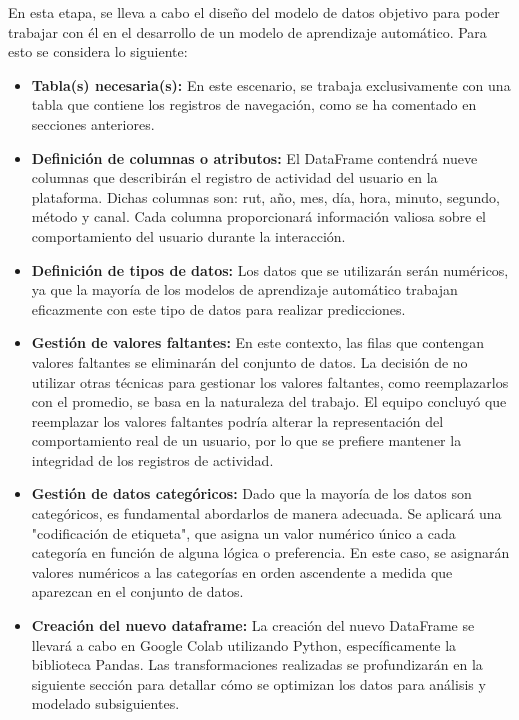 En esta etapa, se lleva a cabo el diseño del modelo de datos objetivo para poder trabajar con él en el desarrollo de un modelo de aprendizaje automático. Para esto se considera lo siguiente:
\begin{itemize}
    \item  \textbf{Tabla(s) necesaria(s):} En este escenario, se trabaja exclusivamente con una tabla que contiene los registros de navegación, como se ha comentado en secciones anteriores.
    \item \textbf{Definición de columnas o atributos:} El DataFrame contendrá nueve columnas que describirán el registro de actividad del usuario en la plataforma. Dichas columnas son: rut, año, mes, día, hora, minuto, segundo, método y canal. Cada columna proporcionará información valiosa sobre el comportamiento del usuario durante la interacción.
    \item \textbf{Definición de tipos de datos:} Los datos que se utilizarán serán numéricos, ya que la mayoría de los modelos de aprendizaje automático trabajan eficazmente con este tipo de datos para realizar predicciones.
    \item \textbf{Gestión de valores faltantes:} En este contexto, las filas que contengan valores faltantes se eliminarán del conjunto de datos. La decisión de no utilizar otras técnicas para gestionar los valores faltantes, como reemplazarlos con el promedio, se basa en la naturaleza del trabajo. El equipo concluyó que reemplazar los valores faltantes podría alterar la representación del comportamiento real de un usuario, por lo que se prefiere mantener la integridad de los registros de actividad.
    \item \textbf{Gestión de datos categóricos:} Dado que la mayoría de los datos son categóricos, es fundamental abordarlos de manera adecuada. Se aplicará una "codificación de etiqueta", que asigna un valor numérico único a cada categoría en función de alguna lógica o preferencia. En este caso, se asignarán valores numéricos a las categorías en orden ascendente a medida que aparezcan en el conjunto de datos.
    \item \textbf{Creación del nuevo dataframe:} La creación del nuevo DataFrame se llevará a cabo en Google Colab utilizando Python, específicamente la biblioteca Pandas. Las transformaciones realizadas se profundizarán en la siguiente sección para detallar cómo se optimizan los datos para análisis y modelado subsiguientes.
\end{itemize}